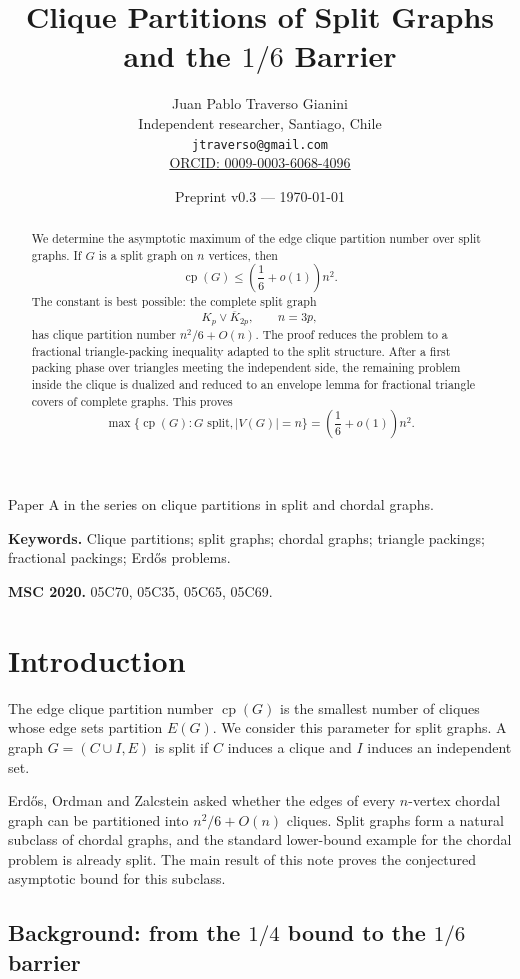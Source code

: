 \documentclass[11pt]{article}
\title{Clique Partitions of Split Graphs and the $1/6$ Barrier}
\author{
Juan Pablo Traverso Gianini\\
Independent researcher, Santiago, Chile\\
\texttt{jtraverso@gmail.com}\\
\href{https://orcid.org/0009-0003-6068-4096}{ORCID: 0009-0003-6068-4096}
}
\date{Preprint v0.3 --- \today}
\newcommand{\cp}{\operatorname{cp}}
\begin{document}
\maketitle

\begin{center}
{\small Paper A in the series on clique partitions in split and chordal graphs.}
\end{center}

\noindent\textbf{Keywords.}
Clique partitions; split graphs; chordal graphs; triangle packings; fractional packings; Erdős problems.

\medskip

\noindent\textbf{MSC 2020.}
05C70, 05C35, 05C65, 05C69.

\begin{abstract}
We determine the asymptotic maximum of the edge clique partition number over split graphs. If \(G\) is a split graph on \(n\) vertices, then
\[
    \cp(G)\le \left(\frac16+o(1)\right)n^2 .
\]
The constant is best possible: the complete split graph
\[
    K_p\vee\overline{K}_{2p}, \qquad n=3p,
\]
has clique partition number \(n^2/6+O(n)\). The proof reduces the problem to a fractional triangle-packing inequality adapted to the split structure. After a first packing phase over triangles meeting the independent side, the remaining problem inside the clique is dualized and reduced to an envelope lemma for fractional triangle covers of complete graphs. This proves
\[
    \max\{\cp(G):G\text{ split}, |V(G)|=n\}
    =
    \left(\frac16+o(1)\right)n^2.
\]
\end{abstract}

\section{Introduction}

The edge clique partition number \(\cp(G)\) is the smallest number of cliques whose edge sets partition \(E(G)\). We consider this parameter for split graphs. A graph \(G=(C\cup I,E)\) is split if \(C\) induces a clique and \(I\) induces an independent set.

Erdős, Ordman and Zalcstein asked whether the edges of every \(n\)-vertex chordal graph can be partitioned into \(n^2/6+O(n)\) cliques. Split graphs form a natural subclass of chordal graphs, and the standard lower-bound example for the chordal problem is already split. The main result of this note proves the conjectured asymptotic bound for this subclass.


\subsection*{Background: from the \(1/4\) bound to the \(1/6\) barrier}
\end{document}
